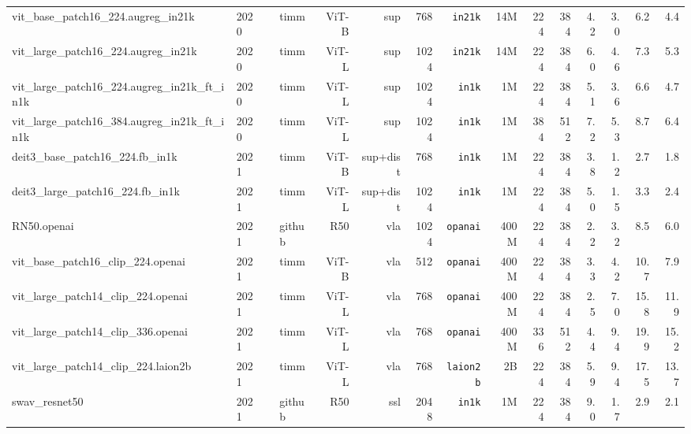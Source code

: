 \begin{tabular}{llllrrrrrrrRRRR}
vit\_base\_patch16\_224.augreg\_in21k             & 2020 & \cite{dbk+21,vit-augreg} & timm        & ViT-B & sup      & 768  & \texttt{in21k}     & 14M  & 224 & 384 & 4.2  & 3.0 & 6.2   & 4.4  \\
vit\_large\_patch16\_224.augreg\_in21k            & 2020 & \cite{dbk+21,vit-augreg} & timm        & ViT-L & sup      & 1024 & \texttt{in21k}     & 14M  & 224 & 384 & 6.0  & 4.6 & 7.3   & 5.3  \\
vit\_large\_patch16\_224.augreg\_in21k\_ft\_in1k  & 2020 & \cite{dbk+21,vit-augreg} & timm        & ViT-L & sup      & 1024 & \texttt{in1k}      & 1M   & 224 & 384 & 5.1  & 3.6 & 6.6   & 4.7  \\
vit\_large\_patch16\_384.augreg\_in21k\_ft\_in1k  & 2020 & \cite{dbk+21,vit-augreg} & timm        & ViT-L & sup      & 1024 & \texttt{in1k}      & 1M   & 384 & 512 & 7.2  & 5.3 & 8.7   & 6.4  \\
deit3\_base\_patch16\_224.fb\_in1k                & 2021 & \cite{tcd+21}            & timm        & ViT-B & sup+dist & 768  & \texttt{in1k}      & 1M   & 224 & 384 & 3.8  & 1.2 & 2.7   & 1.8  \\
deit3\_large\_patch16\_224.fb\_in1k               & 2021 & \cite{tcd+21}            & timm        & ViT-L & sup+dist & 1024 & \texttt{in1k}      & 1M   & 224 & 384 & 5.0  & 1.5 & 3.3   & 2.4  \\
RN50.openai                                       & 2021 & \cite{clip}              & github      & R50   & vla      & 1024 & \texttt{opanai}    & 400M & 224 & 384 & 2.2  & 3.2 & 8.5   & 6.0  \\
vit\_base\_patch16\_clip\_224.openai              & 2021 & \cite{clip}              & timm        & ViT-B & vla      & 512  & \texttt{opanai}    & 400M & 224 & 384 & 3.3  & 4.2 & 10.7  & 7.9  \\
vit\_large\_patch14\_clip\_224.openai             & 2021 & \cite{clip}              & timm        & ViT-L & vla      & 768  & \texttt{opanai}    & 400M & 224 & 384 & 2.5  & 7.0 & 15.8  & 11.9 \\
vit\_large\_patch14\_clip\_336.openai             & 2021 & \cite{clip}              & timm        & ViT-L & vla      & 768  & \texttt{opanai}    & 400M & 336 & 512 & 4.4  & 9.4 & 19.9  & 15.2 \\
vit\_large\_patch14\_clip\_224.laion2b            & 2021 & \cite{cbw+23,iww+21}     & timm        & ViT-L & vla      & 768  & \texttt{laion2b}   & 2B   & 224 & 384 & 5.9  & 9.4 & 17.5  & 13.7 \\
swav\_resnet50                                    & 2021 & \cite{cmm+20}            & github      & R50   & ssl      & 2048 & \texttt{in1k}      & 1M   & 224 & 384 & 9.0  & 1.7 & 2.9   & 2.1  \\

\end{tabular}
